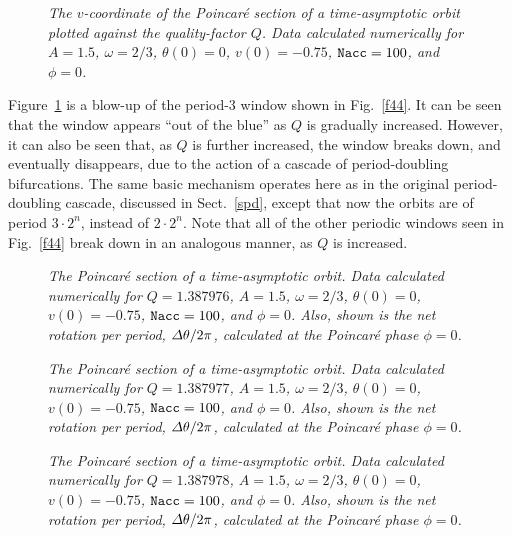 \begin{figure}
\epsfysize=3.5in
\centerline{}
\caption{\em The $v$-coordinate of the Poincar\'{e} section of a time-asymptotic orbit
plotted against the quality-factor $Q$. Data
 calculated numerically for
$A=1.5$, $\omega=2/3$, $\theta(0)=0$, $v(0)=-0.75$, ${\tt Nacc} =100$, and $\phi=0$.}\label{f45}
\end{figure}


Figure~\ref{f45} is a blow-up of the period-3 window shown in Fig.~\ref{f44}. It can be
seen that the window appears ``out of the blue'' as $Q$ is gradually increased. However,
it can also be seen that, as $Q$ is further increased,  the window breaks down,
and eventually disappears, due to the action of a cascade of period-doubling
bifurcations. The same basic mechanism operates here as in the original period-doubling
cascade, discussed in Sect.~\ref{spd}, except that now the orbits are of period $3\cdot 2^n$, instead of $2\cdot 2^n$. 
Note that all of the other periodic windows seen in Fig.~\ref{f44} break down in an analogous manner,
as $Q$ is increased.


\begin{figure}
\epsfysize=2.25in
\centerline{}
\caption{\em The Poincar\'{e} section of a time-asymptotic orbit. Data
calculated numerically for $Q=1.387976$, $A=1.5$, $\omega=2/3$,
$\theta(0)=0$, $v(0)=-0.75$,
 ${\tt Nacc} =100$, and $\phi=0$. Also, shown is the
net rotation per period, ${\mit\Delta}\theta/2\pi$, calculated at the Poincar\'{e} phase
$\phi=0$.}\label{f46}
\end{figure}

\begin{figure}
\epsfysize=2.25in
\centerline{}
\caption{\em The Poincar\'{e} section of a time-asymptotic orbit. Data
calculated numerically for $Q=1.387977$, $A=1.5$, $\omega=2/3$,
$\theta(0)=0$, $v(0)=-0.75$,
 ${\tt Nacc} =100$, and $\phi=0$. Also, shown is the
net rotation per period, ${\mit\Delta}\theta/2\pi$, calculated at the Poincar\'{e} phase
$\phi=0$.}\label{f47}
\end{figure}

\begin{figure}
\epsfysize=2.25in
\centerline{}
\caption{\em The Poincar\'{e} section of a time-asymptotic orbit. Data
calculated numerically for $Q=1.387978$, $A=1.5$, $\omega=2/3$,
$\theta(0)=0$, $v(0)=-0.75$,
 ${\tt Nacc} =100$, and $\phi=0$. Also, shown is the
net rotation per period, ${\mit\Delta}\theta/2\pi$, calculated at the Poincar\'{e} phase
$\phi=0$.}\label{f48}
\end{figure}


